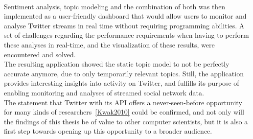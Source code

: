 \\
Sentiment analysis, topic modeling and the combination of both was then implemented as a user-friendly dashboard that would
allow users to monitor and analyse Twitter streams in real time without requiring programming abilities.
A set of challenges regarding the performance requirements when having to perform these analyses in real-time,
and the visualization of these results, were encountered and solved.
\\
The resulting application showed the static topic model to not be perfectly accurate anymore,
due to only temporarily relevant topics.
Still, the application provides interesting insights into activity on Twitter,
and fulfills its purpose of enabling monitoring and analyses of streamed social network data.
\\
The statement that Twitter with its API offers a never-seen-before opportunity for
many kinds of researchers~\ref{Kwak2010} could be confirmed,
and not only will the findings of this thesis be of value to other computer scientists,
but it is also a first step towards opening up this opportunity to a broader audience.
